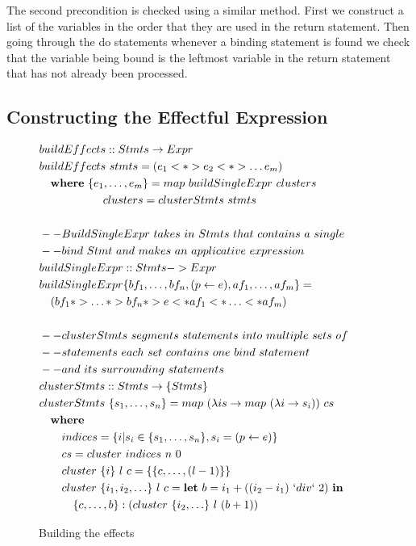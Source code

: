The second precondition is checked using a similar method. First we construct a list of the variables in the order that they are used in the return statement. Then going through the do statements whenever a binding statement is found we check that the variable being bound is the leftmost variable in the return statement that has not already been processed.

\subsection{Constructing the Effectful Expression}
\begin{figure}[t]
\begin{math}
\begin{aligned}
&buildEffects :: Stmts \rightarrow Expr&\\
&buildEffects\ stmts = (e_1 <*> e_2 <*> \ldots e_m)\\
&\quad \textbf{where}\ \{e_1, \ldots, e_m \} = map\ buildSingleExpr\ clusters\\
&\qquad \quad \quad \quad\ \ clusters = clusterStmts\ stmts\\
\\
&--BuildSingleExpr\ takes\ in\ Stmts\ that\ contains\ a\ single\\
&--bind\ Stmt\ and\ makes\ an\ applicative\ expression\\
&buildSingleExpr :: Stmts -> Expr\\
&buildSingleExpr \{bf_1, \ldots, bf_n, (p \leftarrow e), af_1, \ldots, af_m\} = \\
&\quad(bf_1 *> \ldots *> bf_n *> e <* af_1 <* \ldots <* af_m)\\
\\
&--clusterStmts\ segments\ statements\ into\ multiple\ sets\ of\\
&--statements\ each\ set\ contains\ one\ bind\ statement\\
&--and\ its\ surrounding\ statements\\
&clusterStmts :: Stmts \rightarrow \{Stmts\}\\
&clusterStmts\ \{s_1, \ldots, s_n \} = map\ (\lambda is \rightarrow map\ (\lambda i \rightarrow s_i))\ cs\\
&\quad \textbf{where}\\
&\qquad indices = \{i | s_i \in \{s_1, \ldots, s_n\}, s_i = (p \leftarrow e)\}\\
&\qquad cs = cluster\ indices\ n\ 0\\
&\qquad cluster\ \{i\}\ l\ c = \{\{c, \ldots, (l-1)\}\}\\
&\qquad cluster\ \{i_1,i_2,\ldots \}\ l\ c = \textbf{let}\ b = i_1 + ((i_2-i_1)\ `div`\ 2)\ \textbf{in}\\
&\qquad \quad \{c, \ldots, b\}:(cluster\ \{i_2, \ldots \}\ l\ (b+1))
\end{aligned}
\end{math}
\caption{Building the effects}
\label{effects}
\end{figure}


